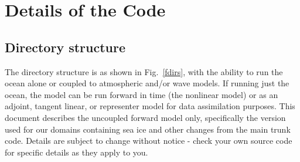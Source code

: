 \section{Details of the Code}
\label{Code}
\subsection{Directory structure}
The directory structure is as shown in Fig.\ \ref{fdirs}, with the
ability to run the ocean alone or coupled to atmospheric and/or
wave models. If running just the ocean, the model can be run forward
in time (the nonlinear model) or as an adjoint, tangent linear, or
representer model for data assimilation purposes. This document
describes the uncoupled forward model only, specifically the version
used for our domains containing sea ice and other
changes from the main trunk code. Details are subject to change
without notice - check your own source code for specific details as
they apply to you.

